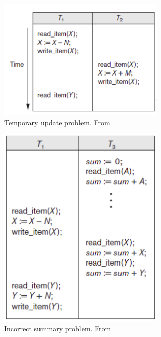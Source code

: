 \newpage
\begin{appendices}
\begin{figure}[H]
    \centering
    \includegraphics[width=8cm]{image/temporary_update_problem.png}
    \caption{Temporary update problem. From \cite{dd}}
    \label{fig:temporary_update_problem}
\end{figure}
\begin{figure}[H]
    \centering
    \includegraphics[width=8cm]{image/incorrect_summary_problem.png}
    \caption{Incorrect summary problem. From \cite{dd}}
    \label{fig:incorrect_summary_problem}
\end{figure}
\end{appendices}
